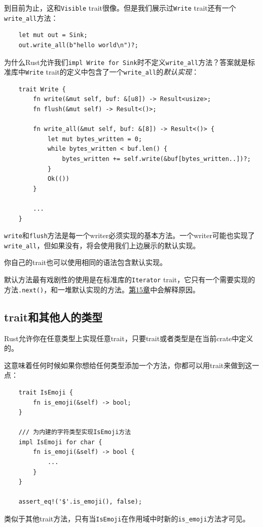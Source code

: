 到目前为止，这和\texttt{Visible} trait很像。但是我们展示过\texttt{Write} trait还有一个\texttt{write\_all}方法：
\begin{verbatim}
    let mut out = Sink;
    out.write_all(b"hello world\n")?;
\end{verbatim}

为什么Rust允许我们\texttt{impl Write for Sink}时不定义\texttt{write\_all}方法？答案就是标准库中\texttt{Write} trait的定义中包含了一个\texttt{write\_all}的\emph{默认实现}：
\begin{verbatim}
    trait Write {
        fn write(&mut self, buf: &[u8]) -> Result<usize>;
        fn flush(&mut self) -> Result<()>;
        
        fn write_all(&mut self, buf: &[8]) -> Result<()> {
            let mut bytes_written = 0;
            while bytes_written < buf.len() {
                bytes_written += self.write(&buf[bytes_written..])?;
            }
            Ok(())            
        }

        ...
    }
\end{verbatim}

\texttt{write}和\texttt{flush}方法是每一个writer必须实现的基本方法。一个writer可能也实现了\texttt{write\_all}，但如果没有，将会使用我们上边展示的默认实现。

你自己的trait也可以使用相同的语法包含默认实现。

默认方法最有戏剧性的使用是在标准库的\texttt{Iterator} trait，它只有一个需要实现的方法\texttt{.next()}，和一堆默认实现的方法。\hyperref[ch15]{第15章}中会解释原因。

\subsection{trait和其他人的类型}\label{OrphanRule}
Rust允许你在任意类型上实现任意trait，只要trait或者类型是在当前crate中定义的。

这意味着任何时候如果你想给任何类型添加一个方法，你都可以用trait来做到这一点：
\begin{verbatim}
    trait IsEmoji {
        fn is_emoji(&self) -> bool;
    }

    /// 为内建的字符类型实现IsEmoji方法
    impl IsEmoji for char {
        fn is_emoji(&self) -> bool {
            ...
        }
    }

    assert_eq!('$'.is_emoji(), false);
\end{verbatim}

类似于其他trait方法，只有当\texttt{IsEmoji}在作用域中时新的\texttt{is\_emoji}方法才可见。

